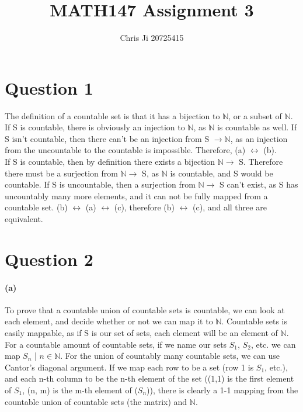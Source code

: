 \documentclass[10pt,letter]{article}
\begin{document}
\title{MATH147 Assignment 3}
\author{Chris Ji 20725415}

\maketitle 

\section*{Question 1}
The definition of a countable set is that it has a bijection to $\mathbb{N}$, or a subset of $\mathbb{N}$. If S is countable, there is obviously an injection to $\mathbb{N}$, as $\mathbb{N}$ is countable as well. If S isn't countable, then there can't be an injection from S $\rightarrow\mathbb{N}$, as an injection from the uncountable to the countable is impossible. Therefore, (a) $\leftrightarrow$ (b). \\
If S is countable, then by definition there exists a bijection $\mathbb{N}\rightarrow$ S. Therefore there must be a surjection from $\mathbb{N}\rightarrow$ S, as $\mathbb{N}$ is countable, and S would be countable. If S is uncountable, then a surjection from $\mathbb{N}\rightarrow$ S can't exist, as S has uncountably many more elements, and it can not be fully mapped from a countable set. 
(b) $\leftrightarrow$ (a) $\leftrightarrow$ (c), therefore (b) $\leftrightarrow$ (c), and all three are equivalent. 

\section*{Question 2}

\paragraph{(a)} 
To prove that a countable union of countable sets is countable, we can look at each element, and decide whether or not we can map it to $\mathbb{N}$. Countable sets is easily mappable, as if S is our set of sets, each element will be an element of $\mathbb{N}$. For a countable amount of countable sets, if we name our sets $S_1$, $S_2$, etc. we can map $S_n$ | $n \in \mathbb{N}$. For the union of countably many countable sets, we can use Cantor's diagonal argument. If we map each row to be a set (row 1 is $S_1$, etc.), and each n-th column to be the n-th element of the set ((1,1) is the first element of $S_1$, (n, m) is the m-th element of ($S_n$)), there is clearly a 1-1 mapping from the countable union of countable sets (the matrix) and $\mathbb{N}$. 
\end{document}
